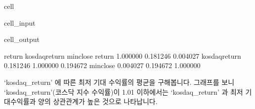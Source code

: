 \documentclass[letterpaper,10pt,english]{jupyterBook}
\begin{document}
\begin{sphinxuseclass}{cell}\begin{sphinxVerbatimInput}

\begin{sphinxuseclass}{cell_input}
\begin{sphinxVerbatim}[commandchars=\\\{\}]
\PYG{p}{[}\PYG{p}{[}\PYG{p}{]}\PYG{p}{]}
\end{sphinxVerbatim}

\end{sphinxuseclass}\end{sphinxVerbatimInput}
\begin{sphinxVerbatimOutput}

\begin{sphinxuseclass}{cell_output}
\begin{sphinxVerbatim}[commandchars=\\\{\}]
                 return  kosdaq\PYGZus{}return  min\PYGZus{}close
return         1.000000       0.181246  \PYGZhy{}0.004027
kosdaq\PYGZus{}return  0.181246       1.000000   0.194672
min\PYGZus{}close     \PYGZhy{}0.004027       0.194672   1.000000
\end{sphinxVerbatim}

\end{sphinxuseclass}\end{sphinxVerbatimOutput}

\end{sphinxuseclass}
\sphinxAtStartPar
 ‘kosdaq\_return’ 에 따른 최저 기대 수익률의 평균을 구해봅니다. 그래프를 보니 ‘kosdaq\_return’(코스닥 지수 수익률)이 1.01 이하에서는 ‘kosdaq\_return’ 과 최저 기대수익률과 양의 상관관계가 높은 것으로 나타납니다.
\end{document}
